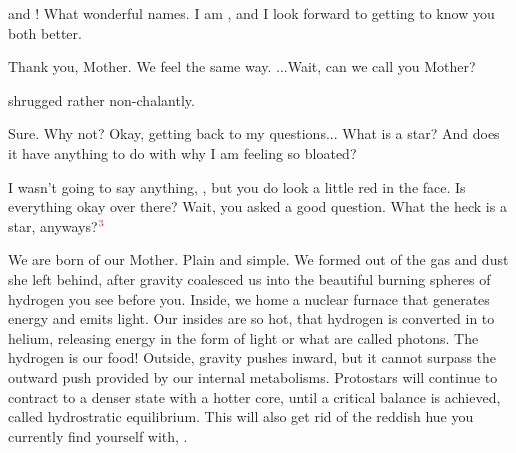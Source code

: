 \documentclass[main.tex]{subfiles}
\begin{document}
\par \Sterope \rmalpha and \rmbeta!  What wonderful names.  I am \rmsterope, and I look forward to getting to know you both better.

\par \Betab Thank you, Mother.  We feel the same way. ...Wait, can we call you Mother?

\par \nar \rmsterope shrugged rather non-chalantly.

\par \Sterope Sure.   Why not?   Okay, getting back to my questions...  What is a star?  And does it have anything to do with why I am feeling so bloated?

\par \Alcyone I wasn't going to say anything, \rmsterope, but you do look a little red in the face.  Is everything okay over there?  Wait, you asked a good question.  What the heck is a star, anyways?$^{\textcolor{red}{3}}$

\par \Maia We are born of our Mother.  Plain and simple.  We formed out of the gas and dust she left behind, after gravity coalesced us into the beautiful burning spheres of hydrogen you see before you.  Inside, we home a nuclear furnace that generates energy and emits light.  Our insides are so hot, that hydrogen is converted in to helium, releasing energy in the form of light or what are called photons.  The hydrogen is our food!  Outside, gravity pushes inward, but it cannot surpass the outward push provided by our internal metabolisms.  Protostars will continue to contract to a denser state with a hotter core, until a critical balance is achieved, called hydrostratic equilibrium.  This will also get rid of the reddish hue you currently find yourself with, \rmsterope.

\end{document}
